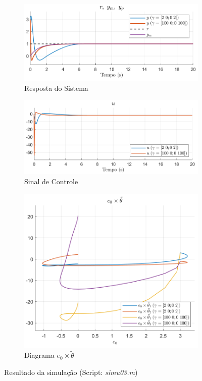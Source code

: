\documentclass[10pt]{article}
\begin{document}
\begin{figure}[h!]
    \begin{subfigure}[b]{0.3\textwidth}
        \centering
        \includegraphics[width=\textwidth]{img/fig03c.png}
        \caption{Resposta do Sistema}
    \end{subfigure}
    \begin{subfigure}[b]{0.3\textwidth}
        \centering
        \includegraphics[width=\textwidth]{img/fig03e.png}
        \caption{Sinal de Controle}
    \end{subfigure}

    \begin{subfigure}[b]{0.3\textwidth}
        \centering
        \includegraphics[width=\textwidth]{img/fig03d.png}
        \caption{Diagrama $e_0 \times \tilde{\theta}$}
    \end{subfigure}

    \caption{Resultado da simulação (Script: \textit{simu03.m})}
    \label{fig:sim3}
\end{figure}
\end{document}
